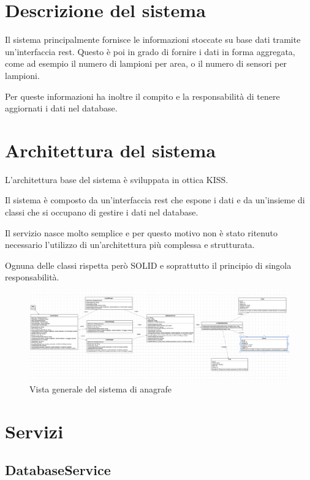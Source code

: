 \section{Descrizione del sistema}

Il sistema principalmente fornisce le informazioni stoccate su base dati tramite un'interfaccia rest.
Questo è poi in grado di fornire i dati in forma aggregata, come ad esempio il numero di lampioni per area, o il numero di sensori per lampioni.

Per queste informazioni ha inoltre il compito e la responsabilità di tenere aggiornati i dati nel database.

\section{Architettura del sistema}

L'architettura base del sistema è sviluppata in ottica KISS.

Il sistema è composto da un'interfaccia rest che espone i dati e da un'insieme di classi che si occupano di gestire i dati nel database.

Il servizio nasce molto semplice e per questo motivo non è stato ritenuto necessario l'utilizzo di un'architettura più complessa e strutturata.

Ognuna delle classi rispetta però SOLID e soprattutto il principio di singola responsabilità.

\begin{figure}[h]
    \centering
    \includegraphics[width=\textwidth]{img/anagrafe_generale.png}
    \caption{Vista generale del sistema di anagrafe}
    \label{fig:general_anagrafe}
\end{figure}

\section{Servizi}

\subsection{DatabaseService}

